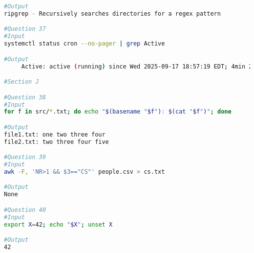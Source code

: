 \begin{lstlisting}[style=linuxstyle, language=bash]
#Output
ripgrep - Recursively searches directories for a regex pattern

#Question 37
#Input
systemctl status cron --no-pager | grep Active

#Output
     Active: active (running) since Wed 2025-09-17 18:57:19 EDT; 4min 20s ago

#Section J

#Question 38
#Input
for f in src/*.txt; do echo "$(basename "$f"): $(cat "$f")"; done

#Output
file1.txt: one two three four
file2.txt: two three four five

#Question 39
#Input
awk -F, 'NR>1 && $3=="CS"' people.csv > cs.txt

#Output
None

#Question 40
#Input
export X=42; echo "$X"; unset X

#Output
42

\end{lstlisting}


















